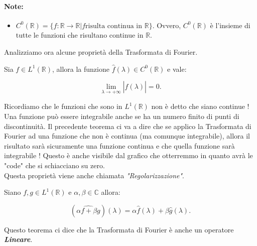 \paragraph{Note:}
\begin{itemize}
    \item $C^0(\mathbb{R}) = \{ f: \mathbb{R} \rightarrow \mathbb{R} | f \text{
                  risulta continua in } \mathbb{R} \}$. Ovvero, $C^0(\mathbb{R})$ è
          l'insieme di tutte le funzioni che risultano continue in
          $\mathbb{R}$.
\end{itemize}

Analizziamo ora alcune proprietà della Trasformata di Fourier.

\begin{theorem}
    Sia $f \in L^1(\mathbb{R})$, allora la funzione $\hat{f}(\lambda) \in
        C^0(\mathbb{R})$ e vale:

    $$
        \lim_{\lambda \rightarrow +\infty} \left| \hat{f}(\lambda) \right| = 0.
    $$
\end{theorem}

Ricordiamo che le funzioni che sono in $L^1(\mathbb{R})$ non è detto che siano
continue ! Una funzione può essere integrabile anche se ha un numero finito di
punti di discontinuità. Il precedente teorema ci va a dire che se applico la
Trasformata di Fourier ad una funzione che non è continua (ma comunque
integrabile), allora il risultato sarà sicuramente una funzione continua e
che quella funzione sarà integrabile ! Questo è anche visibile dal grafico che
otterremmo in quanto avrà le "code" che si schiacciano su zero.\\
Questa proprietà viene anche chiamata \textit{"Regolarizzazione"}.

\begin{theorem}
    Siano $f, g \in L^1(\mathbb{R})$ e $\alpha, \beta \in \mathbb{C}$ allora:

    $$
        (\widehat{ \alpha f + \beta g })(\lambda) = \alpha \hat{f}(\lambda) +
        \beta \hat{g}(\lambda).
    $$
\end{theorem}

Questo teorema ci dice che la Trasformata di Fourier è anche un operatore
\textbf{\textit{Lineare}}.\\

